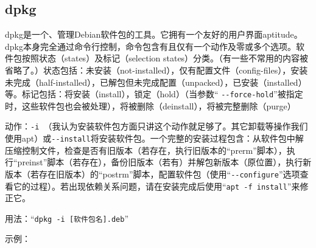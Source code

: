 \subsection{dpkg}
\cite{mandpkg}\par
dpkg是一个、管理Debian软件包的工具。它拥有一个友好的用户界面aptitude。dpkg本身完全通过命令行控制，命令包含有且仅有一个动作及零或多个选项。软件包按照状态（states）及标记（selection states）分类。（有一些不常用的内容被省略了。）状态包括：未安装（not-installed），仅有配置文件（config-files），安装未完成（half-installed），已解包但未完成配置（unpacked），已安装（installed）等。标记包括：将安装（install），锁定（hold）（当参数“ \verb|--force-hold|”被指定时，这些软件包也会被处理），将被删除（deinstall），将被完整删除（purge）\par
动作：\verb|-i |（我认为安装软件包方面只讲这个动作就足够了。其它卸载等操作我们使用apt）或\verb|--install|将安装软件包。一个完整的安装过程包含：从软件包中解压缩控制文件，检查是否有旧版本（若存在，执行旧版本的“prerm”脚本），执行“preinst”脚本（若存在），备份旧版本（若有）并解包新版本（原位置），执行新版本（若存在旧版本）的“postrm”脚本，配置软件包（使用“\verb|--configure|”选项查看它的过程）。若出现依赖关系问题，请在安装完成后使用“\verb|apt -f install|”来修正它。\par
用法：“\verb|dpkg -i [软件包名].deb|”\par
示例：
